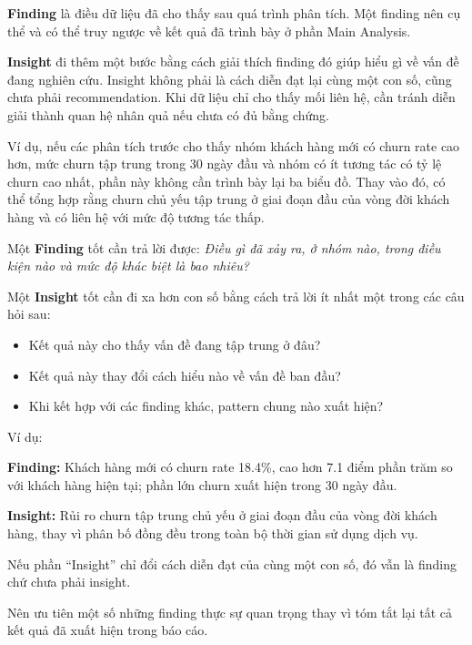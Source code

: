 \documentclass[12pt]{eDA_conquer2026}
\begin{document}
\textbf{Finding} là điều dữ liệu đã cho thấy sau quá trình phân tích. Một finding nên cụ thể và có thể truy ngược về kết quả đã trình bày ở phần Main Analysis.

\textbf{Insight} đi thêm một bước bằng cách giải thích finding đó giúp hiểu gì về vấn đề đang nghiên cứu. Insight không phải là cách diễn đạt lại cùng một con số, cũng chưa phải recommendation. Khi dữ liệu chỉ cho thấy mối liên hệ, cần tránh diễn giải thành quan hệ nhân quả nếu chưa có đủ bằng chứng.

Ví dụ, nếu các phân tích trước cho thấy nhóm khách hàng mới có churn rate cao hơn, mức churn tập trung trong 30 ngày đầu và nhóm có ít tương tác có tỷ lệ churn cao nhất, phần này không cần trình bày lại ba biểu đồ. Thay vào đó, có thể tổng hợp rằng churn chủ yếu tập trung ở giai đoạn đầu của vòng đời khách hàng và có liên hệ với mức độ tương tác thấp.


\begin{aivncodebox}
Một \textbf{Finding} tốt cần trả lời được: \textit{Điều gì đã xảy ra, ở nhóm nào, trong điều kiện nào và mức độ khác biệt là bao nhiêu?}

Một \textbf{Insight} tốt cần đi xa hơn con số bằng cách trả lời ít nhất một trong các câu hỏi sau:

\begin{itemize}
    \item Kết quả này cho thấy vấn đề đang tập trung ở đâu?
    \item Kết quả này thay đổi cách hiểu nào về vấn đề ban đầu?
    \item Khi kết hợp với các finding khác, pattern chung nào xuất hiện?
\end{itemize}

Ví dụ:

\textbf{Finding:} Khách hàng mới có churn rate 18.4\%, cao hơn 7.1 điểm phần trăm so với khách hàng hiện tại; phần lớn churn xuất hiện trong 30 ngày đầu.

\textbf{Insight:} Rủi ro churn tập trung chủ yếu ở giai đoạn đầu của vòng đời khách hàng, thay vì phân bố đồng đều trong toàn bộ thời gian sử dụng dịch vụ.

Nếu phần ``Insight'' chỉ đổi cách diễn đạt của cùng một con số, đó vẫn là finding chứ chưa phải insight.
\end{aivncodebox}


Nên ưu tiên một số những finding thực sự quan trọng thay vì tóm tắt lại tất cả kết quả đã xuất hiện trong báo cáo.
\end{document}
